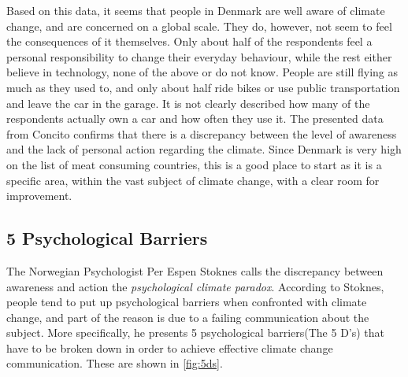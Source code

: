         Based on this data, it seems that people in Denmark are well aware of climate change, and are concerned on a global scale. They do, however, not seem to feel the consequences of it themselves. Only about half of the respondents feel a personal responsibility to change their everyday behaviour, while the rest either believe in technology, none of the above or do not know. People are still flying as much as they used to, and only about half ride bikes or use public transportation and leave the car in the garage. It is not clearly described how many of the respondents actually own a car and how often they use it. The presented data from Concito confirms that there is a discrepancy between the level of awareness and the lack of personal action regarding the climate. Since Denmark is very high on the list of meat consuming countries, this is a good place to start as it is a specific area, within the vast subject of climate change, with a clear room for improvement.
    
    
    \subsection{5 Psychological Barriers}\label{sec:5barriers}
        The Norwegian Psychologist Per Espen Stoknes calls the discrepancy between awareness and action the \textit{psychological climate paradox}\cite{storyAboutClimateChange, the5Ds}. According to Stoknes, people tend to put up psychological barriers when confronted with climate change, and part of the reason is due to a failing communication about the subject. More specifically, he presents 5 psychological barriers(The 5 D's) that have to be broken down in order to achieve effective climate change communication. These are shown in \autoref{fig:5ds}.
        
